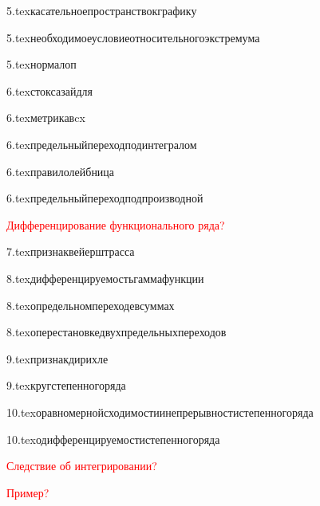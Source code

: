 {5.tex}{касательноепространствокграфику}

{5.tex}{необходимоеусловиеотносительногоэкстремума}

{5.tex}{нормалоп}

{6.tex}{стоксазайдля}

{6.tex}{метрикавcx}

{6.tex}{предельныйпереходподинтегралом}

{6.tex}{правилолейбница}

{6.tex}{предельныйпереходподпроизводной}

\textcolor{red}{Дифференцирование функционального ряда?}

{7.tex}{признаквейерштрасса}

{8.tex}{дифференцируемостьгаммафункции}

{8.tex}{определьномпереходевсуммах}

{8.tex}{оперестановкедвухпредельныхпереходов}

{9.tex}{признакдирихле}

{9.tex}{кругстепенногоряда}

{10.tex}{оравномернойсходимостиинепрерывностистепенногоряда}

{10.tex}{одифференцируемостистепенногоряда}

\textcolor{red}{Следствие об интегрировании?}

\textcolor{red}{Пример?}

